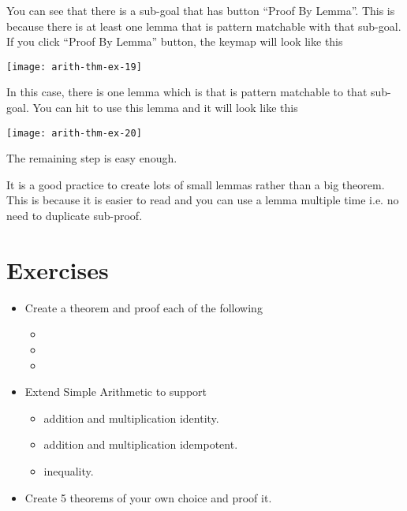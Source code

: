 \documentclass[master.tex]{subfiles}
\begin{document}
You can see that there is a sub-goal that has button ``Proof By Lemma''. This is
because there is at least one lemma that is pattern matchable with that
sub-goal. If you click ``Proof By Lemma'' button, the keymap will look like this

\begin{center}
\texttt{[image: arith-thm-ex-19]}
\end{center}

In this case, there is one lemma which is  that is pattern
matchable to that sub-goal. You can hit  to use this lemma and it
will look like this

\texttt{[image: arith-thm-ex-20]}

The remaining step is easy enough.

It is a good practice to create lots of small lemmas rather than a big theorem.
This is because it is easier to read and you can use a lemma multiple time i.e.
no need to duplicate sub-proof.

\newpage
\section{Exercises}

\begin{itemize}
\item Create a theorem and proof each of the following
  \begin{itemize}
  \item {}
  \item {}
  \item {}
  \end{itemize}
\item Extend Simple Arithmetic to support
  \begin{itemize}
  \item addition and multiplication identity.
  \item addition and multiplication idempotent.
  \item inequality.
  \end{itemize}
\item Create 5 theorems of your own choice and proof it.
\end{itemize}
\end{document}
